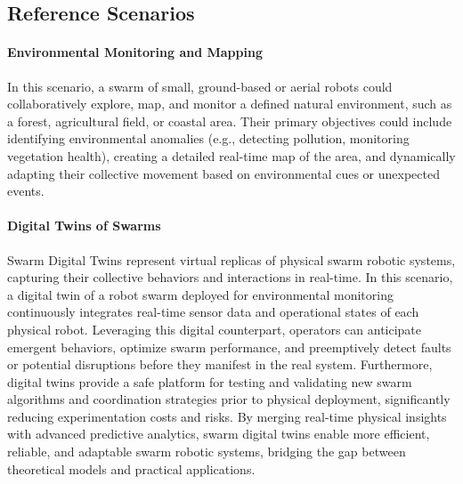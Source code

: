 \documentclass[12pt]{article}
\begin{document}
\subsection{Reference Scenarios}
\label{sec:scenarios}


\paragraph{Environmental Monitoring and Mapping}
In this scenario, a swarm of small, ground-based or aerial robots could collaboratively explore, map, and monitor a defined natural environment, such as a forest, agricultural field, or coastal area. 
Their primary objectives could include identifying environmental anomalies (e.g., detecting pollution, monitoring vegetation health), creating a detailed real-time map of the area, 
and dynamically adapting their collective movement based on environmental cues or unexpected events.

\paragraph{Digital Twins of Swarms}
Swarm Digital Twins represent virtual replicas of physical swarm robotic systems, capturing their collective behaviors and interactions in real-time. 
In this scenario, a digital twin of a robot swarm deployed for environmental monitoring continuously integrates real-time sensor data and operational states of each physical robot. 
Leveraging this digital counterpart, operators can anticipate emergent behaviors, optimize swarm performance, and preemptively detect faults or potential disruptions before they manifest in the real system. 
Furthermore, digital twins provide a safe platform for testing and validating new swarm algorithms and coordination strategies prior to physical deployment, significantly reducing experimentation costs and risks. 
By merging%
 real-time physical insights with advanced predictive analytics, swarm digital twins enable more efficient, reliable, and adaptable swarm robotic systems, bridging the gap between theoretical models and practical applications.
\end{document}
